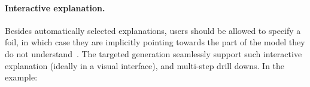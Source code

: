 \paragraph{Interactive explanation.}
Besides automatically selected explanations, users should be allowed to specify a foil, in which case they are implicitly pointing towards the part of the model they do not understand~\cite{miller}.
The targeted generation seamlessly support such interactive explanation (ideally in a visual interface), and multi-step drill downs.
In the example: 


